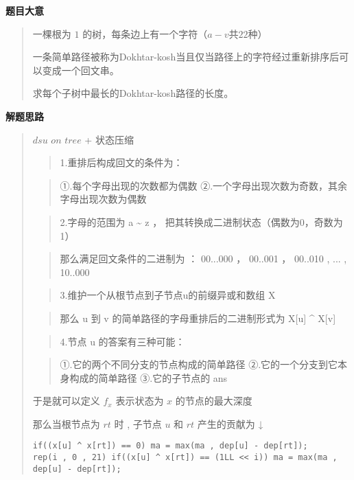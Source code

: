 \documentclass[E:/GsjzTle/main/main.tex]{subfiles}
\begin{document}
\textbf{题目大意}

\begin{quote}
一棵根为 \(1\) 的树，每条边上有一个字符（\(a-v\)共\(22\)种）

一条简单路径被称为Dokhtar-kosh当且仅当路径上的字符经过重新排序后可以变成一个回文串。

求每个子树中最长的Dokhtar-kosh路径的长度。
\end{quote}

\textbf{解题思路}

\begin{quote}
\(dsu\) \(on\) \(tree\) + 状态压缩

\begin{quote}
1.重排后构成回文的条件为：
\end{quote}

\begin{quote}
①.每个字母出现的次数都为偶数
②.一个字母出现次数为奇数，其余字母出现次数为偶数
\end{quote}

\begin{quote}
2.字母的范围为 a \textasciitilde{} z ，
把其转换成二进制状态（偶数为0，奇数为1）
\end{quote}

\begin{quote}
那么满足回文条件的二进制为 ： 00...000 ， 00..001 ， 00..010 , ... ,
10..000
\end{quote}

\begin{quote}
3.维护一个从根节点到子节点u的前缀异或和数组 X
\end{quote}

\begin{quote}
那么 u 到 v 的简单路径的字母重排后的二进制形式为 X{[}u{]} \^{} X{[}v{]}
\end{quote}

\begin{quote}
4.节点 u 的答案有三种可能：
\end{quote}

\begin{quote}
①.它的两个不同分支的节点构成的简单路径
②.它的一个分支到它本身构成的简单路径 ③.它的子节点的 ans
\end{quote}

于是就可以定义 \(f_x\) 表示状态为 \(x\) 的节点的最大深度

那么当根节点为 \(rt\) 时 , 子节点 \(u\) 和 \(rt\) 产生的贡献为 ↓

\begin{lstlisting}
if((x[u] ^ x[rt]) == 0) ma = max(ma , dep[u] - dep[rt]); 
rep(i , 0 , 21) if((x[u] ^ x[rt]) == (1LL << i)) ma = max(ma , dep[u] - dep[rt]);
\end{lstlisting}


\end{quote}
\end{document}
